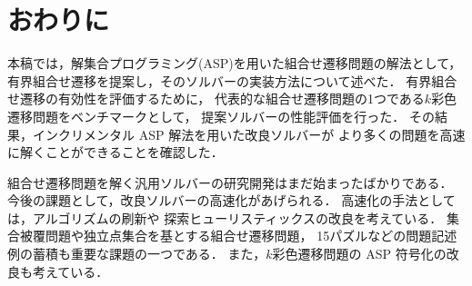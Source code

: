 ﻿%
\section{おわりに}\label{chap:conclusion}

本稿では，解集合プログラミング(ASP)を用いた組合せ遷移問題の解法として，
有界組合せ遷移を提案し，そのソルバーの実装方法について述べた．
有界組合せ遷移の有効性を評価するために，
代表的な組合せ遷移問題の1つである$k$彩色遷移問題をベンチマークとして，
提案ソルバーの性能評価を行った．
その結果，インクリメンタル ASP 解法を用いた改良ソルバーが
より多くの問題を高速に解くことができることを確認した．

組合せ遷移問題を解く汎用ソルバーの研究開発はまだ始まったばかりである．
今後の課題として，改良ソルバーの高速化があげられる．
高速化の手法としては，アルゴリズムの刷新や
探索ヒューリスティックスの改良を考えている．
%
集合被覆問題や独立点集合を基とする組合せ遷移問題，
15パズルなどの問題記述例の蓄積も重要な課題の一つである．
また，$k$彩色遷移問題の ASP 符号化の改良も考えている．


%


